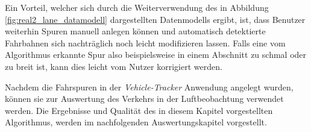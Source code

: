 Ein Vorteil, welcher sich durch die Weiterverwendung des in Abbildung \ref{fig:real2_lane_datamodell}
dargestellten Datenmodells ergibt, ist, dass Benutzer weiterhin Spuren manuell anlegen können und automatisch
detektierte Fahrbahnen sich nachträglich noch leicht modifizieren lassen. Falls eine vom Algorithmus erkannte
Spur also beispielsweise in einem Abschnitt zu schmal oder zu breit ist, kann dies leicht vom Nutzer korrigiert
werden.

Nachdem die Fahrspuren in der \textit{Vehicle-Tracker} Anwendung angelegt wurden, können sie zur Auswertung
des Verkehrs in der Luftbeobachtung verwendet werden.
Die Ergebnisse und Qualität des in diesem Kapitel vorgestellten Algorithmus, werden im nachfolgenden
Auswertungskapitel vorgestellt.